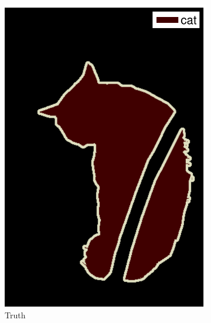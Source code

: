 \documentclass{article} %
\begin{document}
\begin{figure}[tbp]
\begin{subfigure}[b]{0.112\linewidth}
	\includegraphics[width=\linewidth]{figure/2009_002527_gt-eps-converted-to.pdf}
	\caption{\footnotesize{Truth}}
\end{subfigure}
\begin{subfigure}[b]{0.112\linewidth}

\end{subfigure}
\end{figure}
\end{document}
